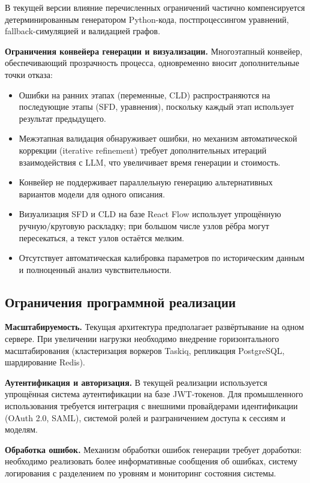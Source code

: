 В текущей версии влияние перечисленных ограничений частично компенсируется детерминированным генератором Python-кода, постпроцессингом уравнений, fallback-симуляцией и валидацией графов.

\textbf{Ограничения конвейера генерации и визуализации.} Многоэтапный конвейер, обеспечивающий прозрачность процесса, одновременно вносит дополнительные точки отказа:

\begin{itemize}
    \item Ошибки на ранних этапах (переменные, CLD) распространяются на последующие этапы (SFD, уравнения), поскольку каждый этап использует результат предыдущего.
    \item Межэтапная валидация обнаруживает ошибки, но механизм автоматической коррекции (iterative refinement) требует дополнительных итераций взаимодействия с LLM, что увеличивает время генерации и стоимость.
    \item Конвейер не поддерживает параллельную генерацию альтернативных вариантов модели для одного описания.
    \item Визуализация SFD и CLD на базе React Flow использует упрощённую ручную/круговую раскладку; при большом числе узлов рёбра могут пересекаться, а текст узлов остаётся мелким.
    \item Отсутствует автоматическая калибровка параметров по историческим данным и полноценный анализ чувствительности.
\end{itemize}

\subsection{Ограничения программной реализации}

\textbf{Масштабируемость.} Текущая архитектура предполагает развёртывание на одном сервере. При увеличении нагрузки необходимо внедрение горизонтального масштабирования (кластеризация воркеров Taskiq, репликация PostgreSQL, шардирование Redis).

\textbf{Аутентификация и авторизация.} В текущей реализации используется упрощённая система аутентификации на базе JWT-токенов. Для промышленного использования требуется интеграция с внешними провайдерами идентификации (OAuth 2.0, SAML), системой ролей и разграничением доступа к сессиям и моделям.

\textbf{Обработка ошибок.} Механизм обработки ошибок генерации требует доработки: необходимо реализовать более информативные сообщения об ошибках, систему логирования с разделением по уровням и мониторинг состояния системы.

